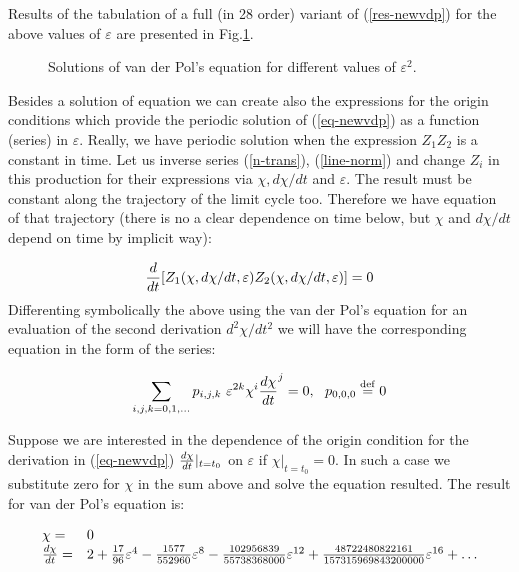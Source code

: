 \noindent
Results of the tabulation of a full (in 28 order) variant of 
(\ref{res-newvdp}) for the above values of $\varepsilon$ are presented in 
Fig.\ref{fig-newvdp}.

\begin{figure}
\label{fig-newvdp}
\vspace{1cm}



\vspace{1cm}
\caption{Solutions of van der Pol's equation for different values 
         of $\varepsilon^2$.}
\end{figure}

Besides a solution of equation we can create also the expressions
for the origin conditions which provide the periodic solution of
(\ref{eq-newvdp}) as a function (series) in $\varepsilon$. Really,
we have periodic solution when the expression $Z_1 Z_2$ is a constant
in time. Let us inverse series (\ref{n-trans}), (\ref{line-norm}) and 
change $Z_i$ in this production for their expressions via $\chi,d\chi/dt$
and $\varepsilon$. The result must be constant along the trajectory 
of the limit cycle too. Therefore we have equation of that trajectory
(there is no a clear dependence on time below, but $\chi$ and $d\chi/dt$
depend on time by implicit way):

$$
{d \over dt} [Z_1(\chi,d\chi/dt,\varepsilon) Z_2(\chi,d\chi/dt,\varepsilon)] 
= 0
$$
\noindent
 Differenting symbolically the above using the van der Pol's equation  
for an evaluation of the second derivation $d^2\chi/dt^2$ we will
have the corresponding equation in the form of the series:

$$
\sum_{i,j,k=0,1,\ldots} p_{i,j,k} \ \varepsilon^{2k} \chi^i
{d\chi \over dt}^j = 0, \ \ p_{0,0,0} \stackrel{\rm def}{=} 0
$$

 Suppose we are interested in the dependence of the origin condition
for the derivation in (\ref{eq-newvdp}) ${d\chi \over dt}|_{t=t_0}$ on 
$\varepsilon$ if $\chi|_{t=t_0} = 0$. In such a case we substitute zero 
for $\chi$ in the sum above and solve the equation resulted. The result for 
van der Pol's equation is:

\begin{equation}
\label{orcond-dChi}
\begin{array}{ll}

\chi = &0\\
{\mathstrut d\chi \over \mathstrut dt} = &2
+{\mathstrut 17 \over \mathstrut 96} \varepsilon^4
-{\mathstrut 1577 \over \mathstrut 552960} \varepsilon^8
-{\mathstrut 102956839 \over \mathstrut 55738368000} \varepsilon^{12}
+{\mathstrut 48722480822161 \over \mathstrut 157315969843200000}
\varepsilon^{16} + \ldots

\end{array}
\end{equation}

